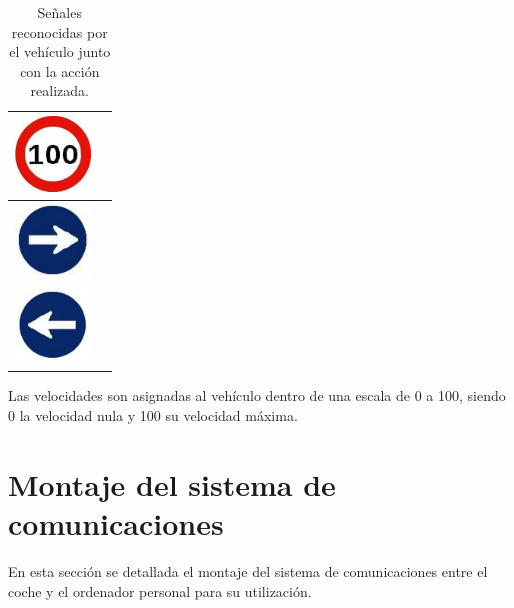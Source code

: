 \begin{table}[H]
  \begin{center}
    \begin{tabular}{|p{2cm}|p{8cm}|}
      \hline \includegraphics[width=2cm]{./imagenes/10.jpg} & \vspace*{-.8in}{Velocidad fijada a 100*.} \\
      \hline \includegraphics[width=2cm]{./imagenes/11.jpg} & \vspace*{-.8in}{Efectúa un giro cerrado a la derecha.} \\
      \hline \includegraphics[width=2cm]{./imagenes/12.jpg} & \vspace*{-.8in}{Efectúa un giro cerrado a la izquierda.} \\
      \hline
    \end{tabular}
  \end{center}
  \caption{Señales reconocidas por el vehículo junto con la acción realizada.}
\end{table}

\begin{fondo}
  \begin{nota}
    Las velocidades son asignadas al vehículo dentro de una escala de 0 a 100, siendo 0 la velocidad nula y 100 su velocidad máxima.
  \end{nota}
\end{fondo}

\section{Montaje del sistema de comunicaciones}
\label{sec:montaje-sistema-comunicaciones}

En esta sección se detallada el montaje del sistema de comunicaciones entre el coche y el ordenador personal para su utilización.\\

